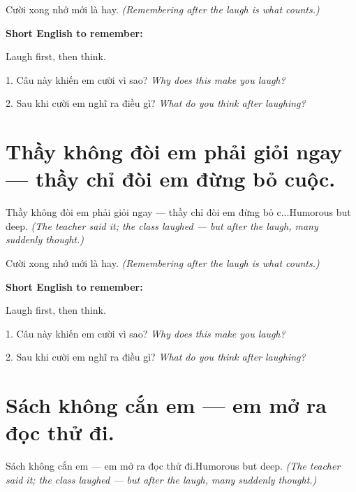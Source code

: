 \begin{baihoc}
Cười xong nhớ mới là hay.
\textit{(Remembering after the laugh is what counts.)}
\end{baihoc}

\begin{ghinhoanh}
\textbf{Short English to remember:}

Laugh first, then think.

\end{ghinhoanh}

\begin{tuhocnhanh}
1. Câu này khiến em cười vì sao? \textit{Why does this make you laugh?}

2. Sau khi cười em nghĩ ra điều gì? \textit{What do you think after laughing?}
\end{tuhocnhanh}
\ngancach


\section{Thầy không đòi em phải giỏi ngay — thầy chỉ đòi em đừng bỏ cuộc.}
\begin{truyen}{Thầy không đòi em phải giỏi ngay — thầy chỉ đòi em đừng bỏ c...}{Humorous but deep.}
\textit{(The teacher said it; the class laughed — but after the laugh, many suddenly thought.)}
\end{truyen}

\begin{baihoc}
Cười xong nhớ mới là hay.
\textit{(Remembering after the laugh is what counts.)}
\end{baihoc}

\begin{ghinhoanh}
\textbf{Short English to remember:}

Laugh first, then think.

\end{ghinhoanh}

\begin{tuhocnhanh}
1. Câu này khiến em cười vì sao? \textit{Why does this make you laugh?}

2. Sau khi cười em nghĩ ra điều gì? \textit{What do you think after laughing?}
\end{tuhocnhanh}
\ngancach


\section{Sách không cắn em — em mở ra đọc thử đi.}
\begin{truyen}{Sách không cắn em — em mở ra đọc thử đi.}{Humorous but deep.}
\textit{(The teacher said it; the class laughed — but after the laugh, many suddenly thought.)}
\end{truyen}

